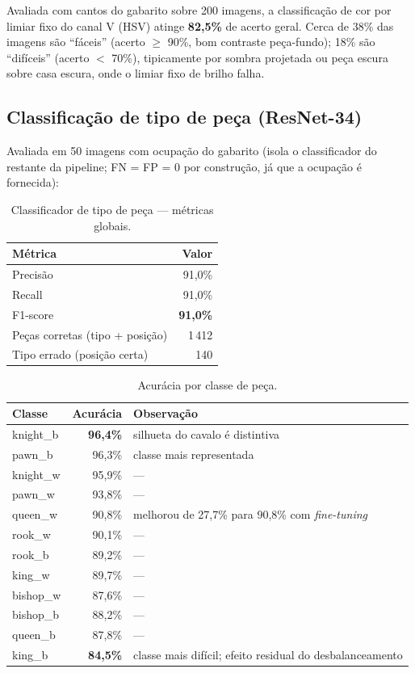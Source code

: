 Avaliada com cantos do gabarito sobre 200 imagens, a classificação de cor por limiar
fixo do canal V (HSV) atinge \textbf{82,5\%} de acerto geral. Cerca de 38\% das imagens
são ``fáceis'' (acerto $\geq$ 90\%, bom contraste peça-fundo); 18\% são ``difíceis''
(acerto $<$ 70\%), tipicamente por sombra projetada ou peça escura sobre casa escura, onde
o limiar fixo de brilho falha.

\subsection{Classificação de tipo de peça (ResNet-34)}

Avaliada em 50 imagens com ocupação do gabarito (isola o classificador do restante da
pipeline; FN = FP = 0 por construção, já que a ocupação é fornecida):

\begin{table}[H]
\centering
\caption{Classificador de tipo de peça --- métricas globais.}
\begin{tabular}{@{}lr@{}}
\toprule
Métrica & Valor \\
\midrule
Precisão & 91,0\% \\
Recall   & 91,0\% \\
F1-score & \textbf{91,0\%} \\
Peças corretas (tipo + posição) & 1\,412 \\
Tipo errado (posição certa)     & 140 \\
\bottomrule
\end{tabular}
\end{table}

\begin{table}[H]
\centering
\caption{Acurácia por classe de peça.}
\begin{tabular}{@{}lrl@{}}
\toprule
Classe & Acurácia & Observação \\
\midrule
knight\_b & \textbf{96,4\%} & silhueta do cavalo é distintiva \\
pawn\_b   & 96,3\% & classe mais representada \\
knight\_w & 95,9\% & --- \\
pawn\_w   & 93,8\% & --- \\
queen\_w  & 90,8\% & melhorou de 27,7\% para 90,8\% com \textit{fine-tuning} \\
rook\_w   & 90,1\% & --- \\
rook\_b   & 89,2\% & --- \\
king\_w   & 89,7\% & --- \\
bishop\_w & 87,6\% & --- \\
bishop\_b & 88,2\% & --- \\
queen\_b  & 87,8\% & --- \\
king\_b   & \textbf{84,5\%} & classe mais difícil; efeito residual do desbalanceamento \\
\bottomrule
\end{tabular}
\end{table}

